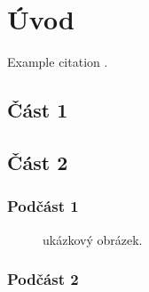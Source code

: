 \documentclass[12pt]{article} %
\begin{document}
\section{Úvod} %

Example citation \cite{Figueredo:2009dg}.


\subsection{Část 1} %

\lipsum[1] %


\subsection{Část 2} %

\lipsum[2] %


\subsubsection{Podčást 1} %

\lipsum[3] %

\begin{figure}[H] %
\caption{ukázkový obrázek.}
\label{fig:speciation}
\end{figure}


\subsubsection{Podčást 2} %

\lipsum[4] %
\end{document}
